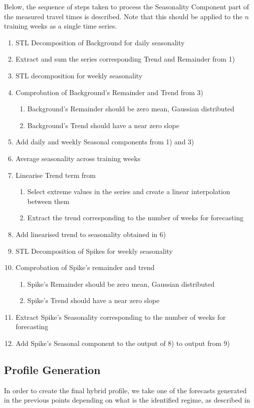 \documentclass[conference]{IEEEtran}
\begin{document}
Below, the sequence of steps taken to process the Seasonality Component part of the measured travel times is described. Note that this should be applied to the $n$ training weeks as a single time series.
\begin{enumerate}
	\item STL Decomposition of Background for daily seasonality
	\item Extract and sum the series corresponding Trend and Remainder from 1)
	\item STL decomposition for weekly seasonality
	\item Comprobation of Background's Remainder and Trend from 3)
	\begin{enumerate}
		\item Background's Remainder should be zero mean, Gaussian distributed
		\item Background's Trend should have a near zero slope
	\end{enumerate}
	\item Add daily and weekly Seasonal components from 1) and 3)
	\item Average seasonality across training weeks
	\item Linearise Trend term from
	\begin{enumerate}
		\item Select extreme values in the series and create a linear interpolation between them
		\item Extract the trend corresponding to the number of weeks for forecasting
	\end{enumerate}
	\item Add linearised trend to seasonality obtained in 6)
	\item STL Decomposition of Spikes for weekly seasonality
	\item Comprobation of Spike's remainder and trend
	\begin{enumerate}
		\item Spike's Remainder should be zero mean, Gaussian distributed
		\item Spike's Trend should have a near zero slope
	\end{enumerate}
	\item Extract Spike's Seasonality corresponding to the number of weeks for forecasting
	\item Add Spike's Seasonal component to the output of 8) to output from 9)
\end{enumerate}
\subsection{Profile Generation}
In order to create the final hybrid profile, we take one of the forecasts generated in the previous points depending on what is the identified regime, as described in 
\end{document}
